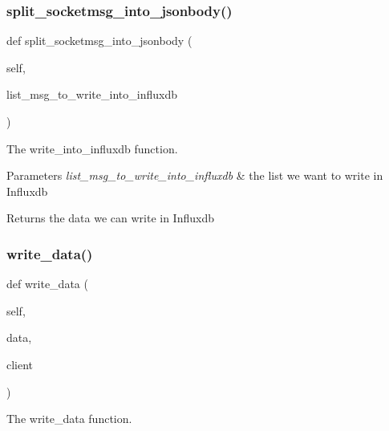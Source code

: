 \subsubsection{\texorpdfstring{split\+\_\+socketmsg\+\_\+into\+\_\+jsonbody()}{split\_socketmsg\_into\_jsonbody()}}
{\footnotesize\ttfamily def split\+\_\+socketmsg\+\_\+into\+\_\+jsonbody (\begin{DoxyParamCaption}\item[{}]{self,  }\item[{}]{list\+\_\+msg\+\_\+to\+\_\+write\+\_\+into\+\_\+influxdb }\end{DoxyParamCaption})}



The write\+\_\+into\+\_\+influxdb function. 


\begin{DoxyParams}{Parameters}
{\em list\+\_\+msg\+\_\+to\+\_\+write\+\_\+into\+\_\+influxdb} & the list we want to write in Influxdb \\
\hline
\end{DoxyParams}
\begin{DoxyReturn}{Returns}
the data we can write in Influxdb 
\end{DoxyReturn}
\mbox{\label{a00033_aeac53798a2492d9c668ee8f6d6ed27a7}} 
\subsubsection{\texorpdfstring{write\+\_\+data()}{write\_data()}}
{\footnotesize\ttfamily def write\+\_\+data (\begin{DoxyParamCaption}\item[{}]{self,  }\item[{}]{data,  }\item[{}]{client }\end{DoxyParamCaption})}



The write\+\_\+data function. 


